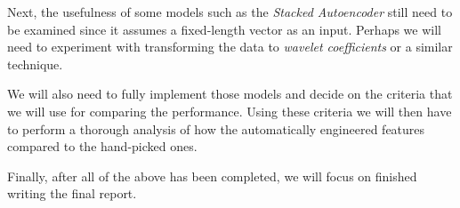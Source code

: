 \documentclass[10pt,a4paper]{article}
\begin{document}
Next, the usefulness of some models such as the \textit{Stacked Autoencoder} still need to be examined since it assumes a fixed-length vector as an input.
Perhaps we will need to experiment with transforming the data to \textit{wavelet coefficients} or a similar technique.

We will also need to fully implement those models and decide on the criteria that we will use for comparing the performance.
Using these criteria we will then have to perform a thorough analysis of how the automatically engineered features compared to the hand-picked ones.

Finally, after all of the above has been completed, we will focus on finished writing the final report.
\end{document}
